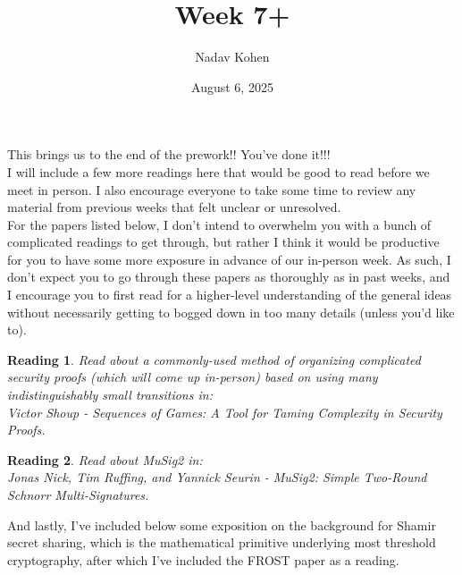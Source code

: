 \documentclass[12pt]{article}
\newtheorem{reading}{Reading}
\theoremstyle{definition}
\theoremstyle{remark}
\theoremstyle{definition}
\begin{document}
\title{Week 7+}
\author{Nadav Kohen}
\date{August 6, 2025}
\maketitle

This brings us to the end of the prework!! You've done it!!!\\

I will include a few more readings here that would be good to read before we meet in person. I also encourage everyone to take some time to review any material from previous weeks that felt unclear or unresolved.\\

For the papers listed below, I don't intend to overwhelm you with a bunch of complicated readings to get through, but rather I think it would be productive for you to have some more exposure in advance of our in-person week. As such, I don't expect you to go through these papers as thoroughly as in past weeks, and I encourage you to first read for a higher-level understanding of the general ideas without necessarily getting to bogged down in too many details (unless you'd like to).

\begin{reading}
Read about a commonly-used method of organizing complicated security proofs (which will come up in-person) based on using many indistinguishably small transitions in:\\
Victor Shoup - Sequences of Games: A Tool for Taming Complexity in Security Proofs.
\end{reading}

\begin{reading}
Read about MuSig2 in:\\
Jonas Nick, Tim Ruffing, and Yannick Seurin - MuSig2: Simple Two-Round Schnorr Multi-Signatures.
\end{reading}

And lastly, I've included below some exposition on the background for Shamir secret sharing, which is the mathematical primitive underlying most threshold cryptography, after which I've included the FROST paper as a reading.\\
\end{document}
